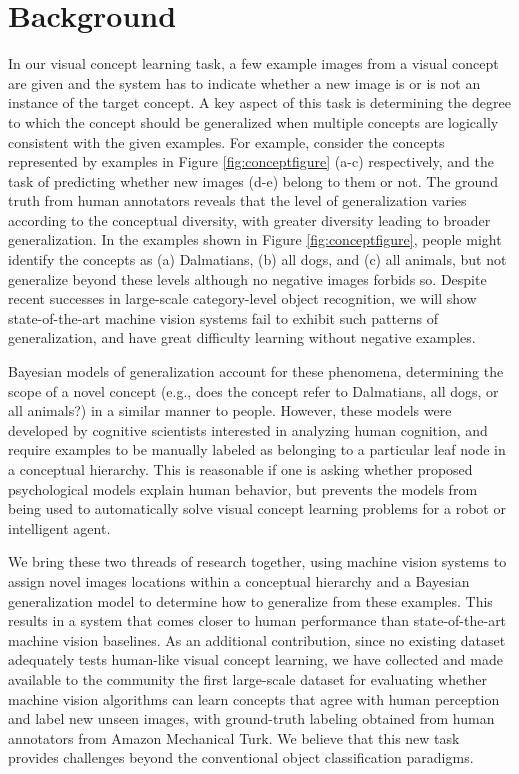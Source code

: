 
\section{Background}

In our visual concept learning task, a few example images from a visual
concept are given and the system has to indicate whether a new image is
or is not an instance of the target concept. A key aspect of this task
is determining the degree to which the concept should be generalized
\cite{xu2007word} when multiple concepts are logically consistent with the given 
examples. For example, consider the concepts represented by
examples in Figure \ref{fig:conceptfigure} (a-c) respectively, and the
task of predicting whether new images (d-e) belong to them or not.  The
ground truth from human annotators reveals that the level of
generalization varies according to the conceptual diversity, with greater diversity leading to broader
generalization. In the examples shown in Figure \ref{fig:conceptfigure}, people might
identify the concepts as (a) Dalmatians, (b) all dogs, and (c) all animals, but not
generalize beyond these levels although no negative images forbids so. Despite recent successes in large-scale
category-level object recognition, we will show state-of-the-art machine vision systems
fail to exhibit such patterns of generalization, and have great difficulty learning without negative
examples.

Bayesian models of generalization \cite{abbott2012, tenenbaum99, xu2007word} account for these phenomena, determining the scope of a
novel concept (e.g., does the concept refer to Dalmatians, all dogs, or
all animals?) in a similar manner to people.  However, these models were
developed by cognitive scientists interested in analyzing human cognition,
and require examples to be manually labeled as belonging to a particular
leaf node in a conceptual hierarchy.  This is reasonable if one is asking
whether proposed psychological models explain human behavior, but prevents the
models from being used to automatically solve visual concept learning
problems for a robot or intelligent agent.

We bring these two threads of research together, using machine vision
systems to assign novel images locations within a conceptual hierarchy and
a Bayesian generalization model to determine how to generalize from these
examples. This results in a system that comes closer to human performance
than state-of-the-art machine vision baselines. As an
additional contribution, since no existing dataset adequately tests
human-like visual concept learning, we have collected and made
available to the community the first large-scale dataset for evaluating
whether machine vision algorithms can learn concepts that agree with
human perception and label new unseen images, with ground-truth labeling
obtained from human annotators from Amazon Mechanical Turk. We believe
that this new task provides challenges 
beyond the conventional object classification paradigms. 


